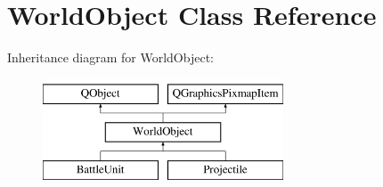 \hypertarget{class_world_object}{}\section{World\+Object Class Reference}
\label{class_world_object}
Inheritance diagram for World\+Object\+:\begin{figure}[H]
\begin{center}
\leavevmode
\includegraphics[height=3.000000cm]{class_world_object}
\end{center}
\end{figure}
